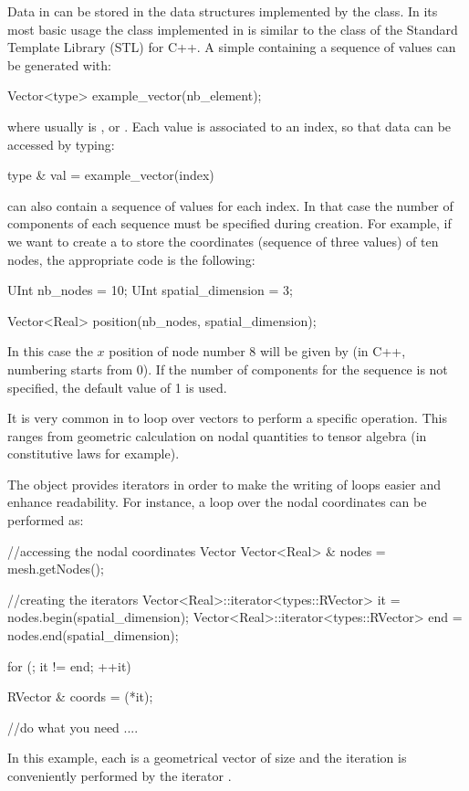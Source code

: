 Data in \akantu can be stored in the data structures implemented by
the  class. In its most basic usage the  class
implemented in \akantu is similar to the  class of
the Standard Template Library (STL) for C++. A simple 
containing a sequence of  values can be generated with:
\begin{cpp}
  Vector<type> example_vector(nb_element);
\end{cpp}
where  usually is ,  or
. Each value is associated to an index, so that data can be
accessed by typing:

\begin{cpp}
  type & val = example_vector(index)
\end{cpp}

 can also contain a sequence of values for each
index. In that case the number of components of each sequence must be
specified during  creation.  For example, if we want to
create a  to store the coordinates (sequence of three
values) of ten nodes, the appropriate code is the following:
\begin{cpp}
  UInt nb_nodes = 10;
  UInt spatial_dimension = 3;

  Vector<Real> position(nb_nodes, spatial_dimension);
\end{cpp}
In this case the $x$ position of node number 8 will be given by
 (in C++, numbering starts from 0). If the number of
components for the sequence is not specified, the default value of 1 is used.

It is very common in \akantu to loop over vectors to perform a specific
operation. This ranges from geometric calculation on nodal quantities
to tensor algebra (in constitutive laws for example).

The  object provides iterators
in order to make the writing of loops easier and enhance readability.
For instance, a loop over the nodal coordinates can be performed as:
\begin{cpp}
  //accessing the nodal coordinates Vector
  Vector<Real> & nodes = mesh.getNodes();

  //creating the iterators
  Vector<Real>::iterator<types::RVector> it  = nodes.begin(spatial_dimension);
  Vector<Real>::iterator<types::RVector> end = nodes.end(spatial_dimension);

  for (; it != end; ++it){
    RVector & coords = (*it);

    //do what you need
    ....
  }
\end{cpp}
In this example, each  is a geometrical vector of size 
and the iteration is conveniently performed by the  iterator .

